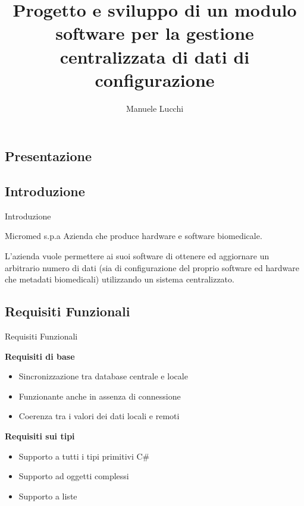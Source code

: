 \documentclass{beamer}
\title{Progetto e sviluppo di un modulo software per la gestione centralizzata di dati di configurazione} %
\author{Manuele Lucchi}
\begin{document}
  \frame[c]{\maketitle}

\begin{darkframes}

  \section{Presentazione}

    \subsection{Introduzione}
    \begin{frame}{Introduzione}

      \begin{block}{Micromed s.p.a}
        Azienda che produce hardware e software biomedicale.
      \end{block}

      L'azienda vuole permettere ai suoi software di ottenere ed aggiornare un arbitrario numero di dati (sia di configurazione del proprio software ed hardware che metadati biomedicali) utilizzando un sistema centralizzato.\\

    \end{frame}

    \subsection{Requisiti Funzionali}
    \begin{frame}{Requisiti Funzionali}

      \textbf{Requisiti di base}
      \begin{itemize}
        \item Sincronizzazione tra database centrale e locale
        \item Funzionante anche in assenza di connessione
        \item Coerenza tra i valori dei dati locali e remoti
      \end{itemize}

      \textbf{Requisiti sui tipi}
      \begin{itemize}
        \item Supporto a tutti i tipi primitivi C\#
        \item Supporto ad oggetti complessi
        \item Supporto a liste
      \end{itemize}


\end{frame}
\end{darkframes}
\end{document}
